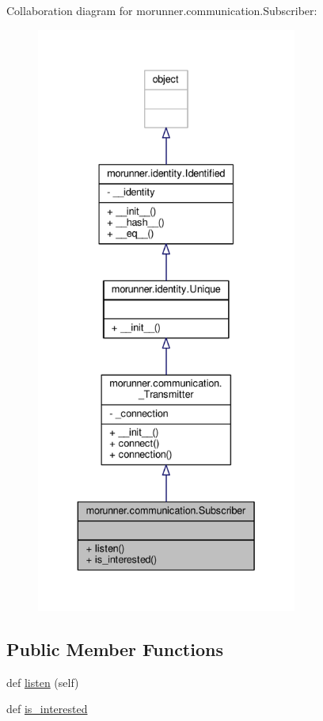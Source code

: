 Collaboration diagram for morunner.\+communication.\+Subscriber\+:
\nopagebreak
\begin{figure}[H]
\begin{center}
\leavevmode
\includegraphics[height=550pt]{classmorunner_1_1communication_1_1Subscriber__coll__graph}
\end{center}
\end{figure}
\subsection*{Public Member Functions}
\begin{DoxyCompactItemize}
\item 
def \hyperlink{classmorunner_1_1communication_1_1Subscriber_ad16726eaf7536b090444a89c1d8b047b}{listen} (self)
\item 
def \hyperlink{classmorunner_1_1communication_1_1Subscriber_a1d8ab4ea99db86ba77176f6f282db254}{is\+\_\+interested}
\end{DoxyCompactItemize}


